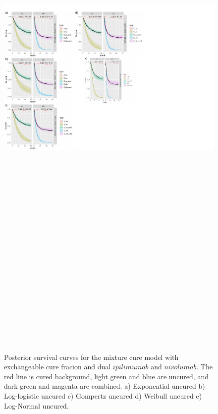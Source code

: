 \documentclass[
]{article}
\begin{document}
\begin{figure}

{\centering \includegraphics[width=25cm,height=40cm]{Check_mate_analysis_files/figure-latex/unnamed-chunk-9-1} 

}

\caption{\label{fig:NIVO+IPI}Posterior survival curves for the mixture cure model with exchangeable cure fracion and dual $ipilimumab$ and $nivolumab$. The red line is cured background, light green and blue are uncured, and dark green and magenta are combined. a) Exponential uncured b) Log-logistic uncured c) Gompertz uncured d) Weibull uncured e) Log-Normal uncured.}\label{fig:unnamed-chunk-9}
\end{figure}
\end{document}
